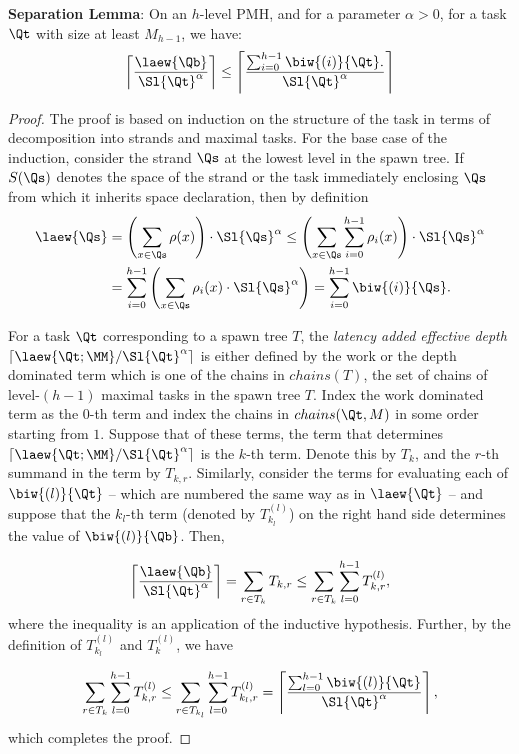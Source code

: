 \begin{lemma}
\textbf{Separation Lemma}: On an $h$-level PMH, and for a parameter
$\alpha>0$, for a task $\Qt$ with size at least $M_{h-1}$, we have:
\[
\left\lceil \frac{\laew{\Qb}}{\Sl{\Qt}^\alpha} \right\rceil
\leq
 \left\lceil \frac{\sum_{i=0}^{h-1} \biw{(i)}{\Qt}.}{\Sl{\Qt}^\alpha} \right\rceil
\]
\label{lemma:lvl-decomp}
\end{lemma}
\begin{proof}
  The proof is based on induction on the structure of the task
in terms of decomposition into strands and maximal tasks.
  For the base case of the induction, consider the strand $\Qs$ at the
  lowest level in the spawn tree. If $S(\Qs)$ denotes the space of the
  strand or the task immediately enclosing $\Qs$ from which it
  inherits space declaration, then by
  definition \begin{align*} \laew{\Qs}
  &= \left(\sum_{x\in \Qs} \rho(x)\right)\cdot \Sl{\Qs}^\alpha \leq \left(\sum_{x\in \Qs} \sum_{i=0}^{h-1}\rho_i(x)\right)\cdot \Sl{\Qs}^\alpha\\
  &= \sum_{i=0}^{h-1}\left(\sum_{x\in \Qs} \rho_i(x)\cdot \Sl{\Qs}^\alpha\right)
  = \sum_{i=0}^{h-1} \biw{(i)}{\Qs}.  \end{align*}

For a task $\Qt$ corresponding to a spawn tree $T$, the \emph{latency
added effective depth}
$\left\lceil{\laew{\Qt;\MM}}/{\Sl{\Qt}^\alpha}\right\rceil$ is either
defined by the work or the depth dominated term which is one of the
chains in $chains(T)$, the set of chains of level-$(h-1)$ maximal
tasks in the spawn tree $T$.  Index the work dominated term as the
$0$-th term and index the chains in $chains(\Qt,M)$ in some order
starting from $1$.  Suppose that of these terms, the term that
determines $\left\lceil{\laew{\Qt;\MM}}/{\Sl{\Qt}^\alpha}\right\rceil$
is the $k$-th term. Denote this by $T_k$, and the $r$-th summand in
the term by $T_{k,r}$.  Similarly, consider the terms for evaluating
each of $\biw{(l)}{\Qt}$ -- which are numbered the same way as in
$\laew{\Qt}$ -- and suppose that the $k_l$-th term (denoted by
$T^{(l)}_{k_l}$) on the right hand side determines the value of
$\biw{(l)}{\Qb}$.  Then,

\begin{equation*}
 \left\lceil \frac{\laew{\Qb}}{\Sl{\Qt}^\alpha} \right\rceil
 = \sum_{r\in T_k} T_{k,r}  \leq \sum_{r\in T_k} \sum_{l=0}^{h-1} T^{(l)}_{k,r},
\end{equation*}
where the inequality is an application of the inductive hypothesis.
Further, by the definition of  $T^{(l)}_{k_l}$ and $T^{(l)}_{k}$, we have

\begin{equation*}
\sum_{r\in T_k} \sum_{l=0}^{h-1} T^{(l)}_{k,r}
    \leq  \sum_{r\in T_{k_l}} \sum_{l=0}^{h-1} T^{(l)}_{k_l,r}
    = \left\lceil \frac{\sum_{l=0}^{h-1} \biw{(l)}{\Qt}}{\Sl{\Qt}^\alpha} \right\rceil,
\end{equation*}
  which completes the proof.
\end{proof}
